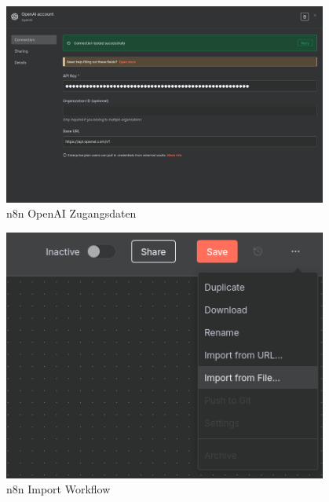 \begin{figure}
    \begin{center}
        \includegraphics[width=0.95\textwidth]{images/n8n_openai_creds.png}
    \end{center}
    \caption{n8n OpenAI Zugangsdaten}\label{fig:n8n_openai_creds}
\end{figure}

\begin{figure}
    \begin{center}
        \includegraphics[width=0.95\textwidth]{images/n8n_import.png}
    \end{center}
    \caption{n8n Import Workflow}\label{fig:n8n_import}
\end{figure}
